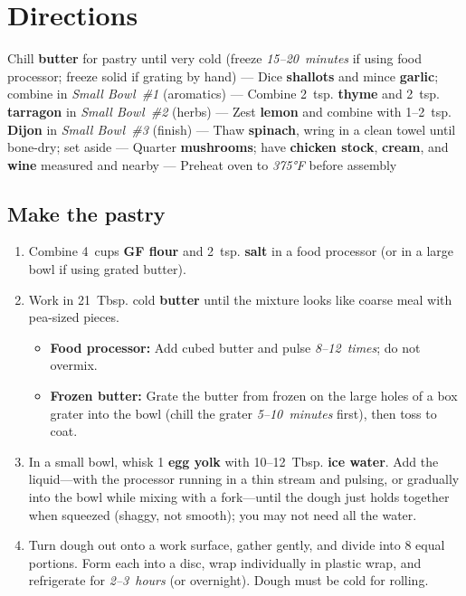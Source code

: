 \documentclass[11pt,letterpaper]{article}
\begin{document}
\section*{Directions}

\noindent
Chill \textbf{butter} for pastry until very cold (freeze \textit{15--20~minutes} if using food processor; freeze solid if grating by hand) ---
Dice \textbf{shallots} and mince \textbf{garlic}; combine in \textit{Small Bowl~\#1} (aromatics) ---
Combine 2~tsp. \textbf{thyme} and 2~tsp. \textbf{tarragon} in \textit{Small Bowl~\#2} (herbs) ---
Zest \textbf{lemon} and combine with 1--2~tsp. \textbf{Dijon} in \textit{Small Bowl~\#3} (finish) ---
Thaw \textbf{spinach}, wring in a clean towel until bone-dry; set aside ---
Quarter \textbf{mushrooms}; have \textbf{chicken stock}, \textbf{cream}, and \textbf{wine} measured and nearby ---
Preheat oven to \textit{375°F} before assembly



\subsection*{Make the pastry}
\begin{enumerate}
    \item Combine 4~cups \textbf{GF flour} and 2~tsp. \textbf{salt} in a food processor (or in a large bowl if using grated butter).
    \item Work in 21~Tbsp. cold \textbf{butter} until the mixture looks like coarse meal with pea-sized pieces.
    \begin{itemize}
        \item \textbf{Food processor:} Add cubed butter and pulse \textit{8--12~times}; do not overmix.
        \item \textbf{Frozen butter:} Grate the butter from frozen on the large holes of a box grater into the bowl (chill the grater \textit{5--10~minutes} first), then toss to coat.
    \end{itemize}
    \item In a small bowl, whisk 1 \textbf{egg yolk} with 10--12~Tbsp. \textbf{ice water}. Add the liquid---with the processor running in a thin stream and pulsing, or gradually into the bowl while mixing with a fork---until the dough just holds together when squeezed (shaggy, not smooth); you may not need all the water.
    \item Turn dough out onto a work surface, gather gently, and divide into 8 equal portions. Form each into a disc, wrap individually in plastic wrap, and refrigerate for \textit{2--3~hours} (or overnight). Dough must be cold for rolling.
\end{enumerate}
\end{document}
